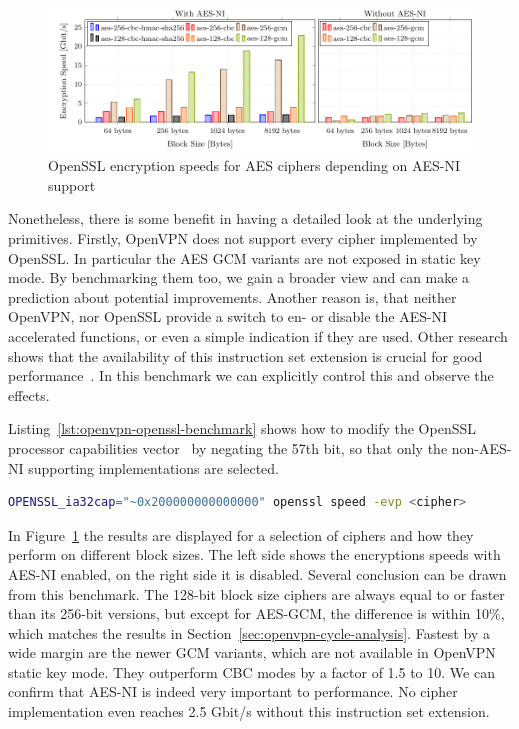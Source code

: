 \documentclass[IN,11pt,twoside,openright,master,english]{tumthesis}
\begin{document}
\begin{figure}[h!]
	\centering
	\includegraphics[width=1.0\linewidth]{figures/openssl_ciphers}
	\caption{OpenSSL encryption speeds for AES ciphers depending on AES-NI support}
	\label{fig:opensslciphers}
\end{figure}

Nonetheless, there is some benefit in having a detailed look at the underlying primitives. Firstly, OpenVPN does not support every cipher implemented by OpenSSL. In particular the AES GCM variants are not exposed in static key mode. By benchmarking them too, we gain a broader view and can make a prediction about potential improvements. Another reason is, that neither OpenVPN, nor OpenSSL provide a switch to en- or disable the AES-NI accelerated functions, or even a simple indication if they are used. Other research shows that the availability of this instruction set extension is crucial for good performance~\cite{raumer2016efficient}\cite{lackovic2017performance}. In this benchmark we can explicitly control this and observe the effects.

Listing~\ref{lst:openvpn-openssl-benchmark} shows how to modify the OpenSSL processor capabilities vector~\cite{openssl-manpage-proc-cap-vector} by negating the 57th bit, so that only the non-AES-NI supporting implementations are selected.

\begin{lstlisting}[caption={Snippet to benchmark OpenSSL with AES-NI disabled},captionpos=b,label={lst:openvpn-openssl-benchmark},language=bash]
OPENSSL_ia32cap="~0x200000000000000" openssl speed -evp <cipher>
\end{lstlisting}

In Figure~\ref{fig:opensslciphers} the results are displayed for a selection of ciphers and how they perform on different block sizes. The left side shows the encryptions speeds with AES-NI enabled, on the right side it is disabled.
Several conclusion can be drawn from this benchmark. 
The 128-bit block size ciphers are always equal to or faster than its 256-bit versions, but except for AES-GCM, the difference is within 10\%, which matches the results in Section~\ref{sec:openvpn-cycle-analysis}.
Fastest by a wide margin are the newer GCM variants, which are not available in OpenVPN static key mode. They outperform CBC modes by a factor of 1.5 to 10. We can confirm that AES-NI is  indeed very important to performance. No cipher implementation even reaches 2.5 Gbit/s without this instruction set extension.
\end{document}
